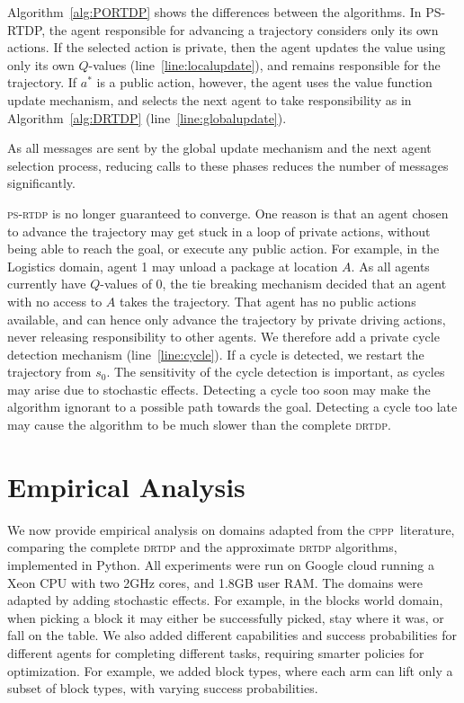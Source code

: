 \documentclass[letterpaper]{article} %
\newcommand{\cppp}{\textsc {cppp}\xspace}
\newcommand{\drtdp}{\textsc {drtdp}\xspace}
\newcommand{\psrtdp}{\textsc{ps}-\textsc{rtdp}\xspace}
\theoremstyle{remark}
\begin{document}
Algorithm~\ref{alg:PORTDP} shows the differences between the algorithms. In PS-RTDP, the agent responsible for advancing a trajectory considers only its own actions. If the selected action is private, then the agent updates the value using only its own $Q$-values (line~\ref{line:localupdate}), and remains responsible for the trajectory. If $a^*$ is a public action, however, the agent uses the value function update mechanism, and selects the next agent to take responsibility as in Algorithm~\ref{alg:DRTDP} (line~\ref{line:globalupdate}).

As all messages are sent by the global update mechanism and the next agent selection process, reducing calls to these phases reduces the number of messages significantly.

\psrtdp is no longer guaranteed to converge. One reason is that an agent chosen to advance the trajectory may get stuck in a loop of private actions, without being able to reach the goal, or execute any public action. For example, in the Logistics domain, agent 1 may unload a package at location $A$. As all agents currently have  $Q$-values of 0, the tie breaking mechanism decided that an agent with no access to $A$ takes the trajectory. That agent has no public actions available, and can hence only advance the trajectory by private driving actions, never releasing responsibility to other agents.
We therefore add a private cycle detection mechanism (line~\ref{line:cycle}). If a cycle is detected, we restart the trajectory from $s_0$. The sensitivity of the cycle detection is important, as cycles may arise due to stochastic effects. Detecting a cycle too soon may make the algorithm ignorant to a possible path towards the goal. Detecting a cycle too late may cause the algorithm to be much slower than the complete \drtdp.


\section{Empirical Analysis}



We now provide empirical analysis on domains adapted from the \cppp\ literature, comparing the complete \drtdp and the approximate \drtdp algorithms, implemented in Python. All experiments were run on Google cloud running a Xeon CPU with two 2GHz cores, and 1.8GB user RAM.
The domains were adapted by adding stochastic effects. For example, in the blocks world domain, when picking a block it may either be successfully picked, stay where it was, or fall on the table. We also added different capabilities and success probabilities for different agents for completing different tasks, requiring smarter policies for optimization. For example, we added block types, where each arm can lift only a subset of block types, with varying success probabilities.
\end{document}
